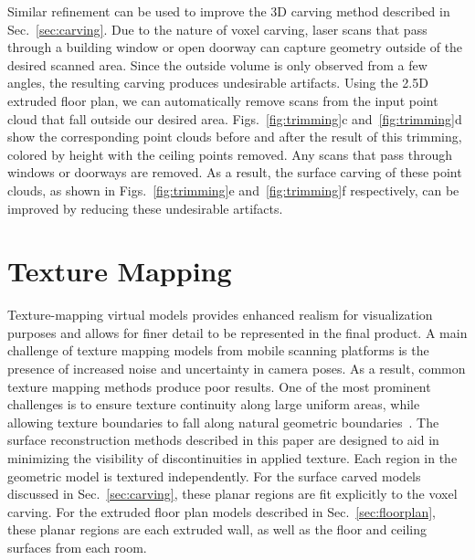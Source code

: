\documentclass[10pt,twocolumn,twoside]{IEEEtran}
\begin{document}
Similar refinement can be used to improve the 3D carving method described in Sec.~\ref{sec:carving}.  Due to the nature of voxel carving, laser scans that pass through a building window or open doorway can capture geometry outside of the desired scanned area.  Since the outside volume is only observed from a few angles, the resulting carving produces undesirable artifacts.  Using the 2.5D extruded floor plan, we can automatically remove scans from the input point cloud that fall outside our desired area.  Figs.~\ref{fig:trimming}c and~\ref{fig:trimming}d show the corresponding point clouds before and after the result of this trimming, colored by height with the ceiling points removed.  Any scans that pass through windows or doorways are removed.  As a result, the surface carving of these point clouds, as shown in Figs.~\ref{fig:trimming}e and~\ref{fig:trimming}f respectively, can be improved by reducing these undesirable artifacts.

\section{Texture Mapping}
\label{sec:texture}

Texture-mapping virtual models provides enhanced realism for visualization purposes and allows for finer detail to be represented in the final product.  A main challenge of texture mapping models from mobile scanning platforms is the presence of increased noise and uncertainty in camera poses.  As a result, common texture mapping methods produce poor results.  One of the most prominent challenges is to ensure texture continuity along large uniform areas, while allowing texture boundaries to fall along natural geometric boundaries~\cite{Cheng14}.  The surface reconstruction methods described in this paper are designed to aid in minimizing the visibility of discontinuities in applied texture.  Each region in the geometric model is textured independently.  For the surface carved models discussed in Sec.~\ref{sec:carving}, these planar regions are fit explicitly to the voxel carving.  For the extruded floor plan models described in Sec.~\ref{sec:floorplan}, these planar regions are each extruded wall, as well as the floor and ceiling surfaces from each room.
\end{document}
